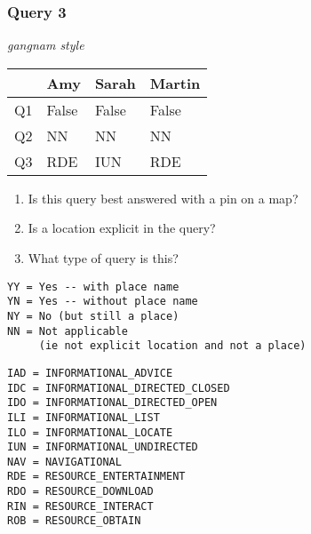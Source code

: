 \begin{frame}[fragile]
\frametitle{Query 3}
\vspace{1em}

\emph{gangnam style}

\vfill

\begin{table}
  \centering
  \begin{tabular}{ l l l l }
    & \textbf{Amy} & \textbf{Sarah} & \textbf{Martin}\\
    \toprule
    Q1 & False & False & False\\
Q2 & NN & NN & NN\\
Q3 & RDE & IUN & RDE\\
    \bottomrule
  \end{tabular}
\end{table}

\vfill

\tiny{

\begin{enumerate}
\item Is this query best answered with a pin on a map?
\item Is a location explicit in the query?
\item What type of query is this?
\end{enumerate}

\vfill

\begin{multicols}{2}
\begin{verbatim}
YY = Yes -- with place name
YN = Yes -- without place name
NY = No (but still a place)
NN = Not applicable 
     (ie not explicit location and not a place)
\end{verbatim}

\columnbreak
\begin{verbatim}
IAD = INFORMATIONAL_ADVICE
IDC = INFORMATIONAL_DIRECTED_CLOSED
IDO = INFORMATIONAL_DIRECTED_OPEN
ILI = INFORMATIONAL_LIST
ILO = INFORMATIONAL_LOCATE
IUN = INFORMATIONAL_UNDIRECTED
NAV = NAVIGATIONAL
RDE = RESOURCE_ENTERTAINMENT
RDO = RESOURCE_DOWNLOAD
RIN = RESOURCE_INTERACT
ROB = RESOURCE_OBTAIN
\end{verbatim}
\end{multicols}
}

\end{frame}



